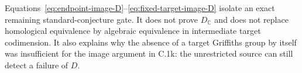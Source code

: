 Equations~\eqref{eq:endpoint-image-D}--\eqref{eq:fixed-target-image-D}
isolate an exact remaining
standard-conjecture gate. It does not prove $D_{\mathbb C}$
and does not replace homological equivalence by algebraic
equivalence in intermediate target codimension. It also
explains why the absence of a target Griffiths group by
itself was insufficient for the image argument in C.1k:
the unrestricted source can still detect a failure of $D$.
